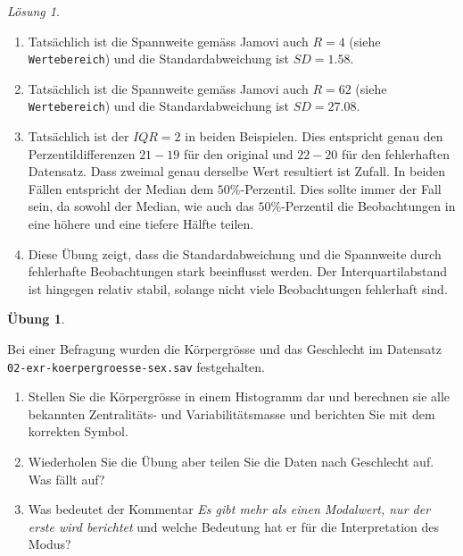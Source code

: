\documentclass[
]{book}
\providecommand{\tightlist}{%
  \setlength{\itemsep}{0pt}\setlength{\parskip}{0pt}}
\theoremstyle{definition}
\theoremstyle{definition}
\theoremstyle{definition}
\newtheorem{exercise}{Übung}[chapter]
\theoremstyle{definition}
\theoremstyle{remark}
\newtheorem*{solution}{Lösung}
\begin{document}
\begin{solution}
\begin{enumerate}
\def\labelenumi{(\alph{enumi})}
\setcounter{enumi}{2}
\tightlist
\item
  Tatsächlich ist die Spannweite gemäss Jamovi auch \(R=4\) (siehe \texttt{Wertebereich}) und die Standardabweichung ist \(SD=1.58\).
\item
  Tatsächlich ist die Spannweite gemäss Jamovi auch \(R=62\) (siehe \texttt{Wertebereich}) und die Standardabweichung ist \(SD=27.08\).
\item
  Tatsächlich ist der \(IQR = 2\) in beiden Beispielen. Dies entspricht genau den Perzentildifferenzen \(21-19\) für den original und \(22-20\) für den fehlerhaften Datensatz. Dass zweimal genau derselbe Wert resultiert ist Zufall. In beiden Fällen entspricht der Median dem \(50\%\)-Perzentil. Dies sollte immer der Fall sein, da sowohl der Median, wie auch das \(50\%\)-Perzentil die Beobachtungen in eine höhere und eine tiefere Hälfte teilen.
\item
  Diese Übung zeigt, dass die Standardabweichung und die Spannweite durch fehlerhafte Beobachtungen stark beeinflusst werden. Der Interquartilabstand ist hingegen relativ stabil, solange nicht viele Beobachtungen fehlerhaft sind.
\end{enumerate}

\end{solution}

\begin{exercise}
\protect\hypertarget{exr:koerpergroesse}{}\label{exr:koerpergroesse}\leavevmode

Bei einer Befragung wurden die Körpergrösse und das Geschlecht im Datensatz \texttt{02-exr-koerpergroesse-sex.sav} festgehalten.

\begin{enumerate}
\def\labelenumi{(\alph{enumi})}
\tightlist
\item
  Stellen Sie die Körpergrösse in einem Histogramm dar und berechnen sie alle bekannten Zentralitäts- und Variabilitätsmasse und berichten Sie mit dem korrekten Symbol.
\item
  Wiederholen Sie die Übung aber teilen Sie die Daten nach Geschlecht auf. Was fällt auf?
\item
  Was bedeutet der Kommentar \emph{Es gibt mehr als einen Modalwert, nur der erste wird berichtet} und welche Bedeutung hat er für die Interpretation des Modus?
\end{enumerate}

\end{exercise}
\end{document}
